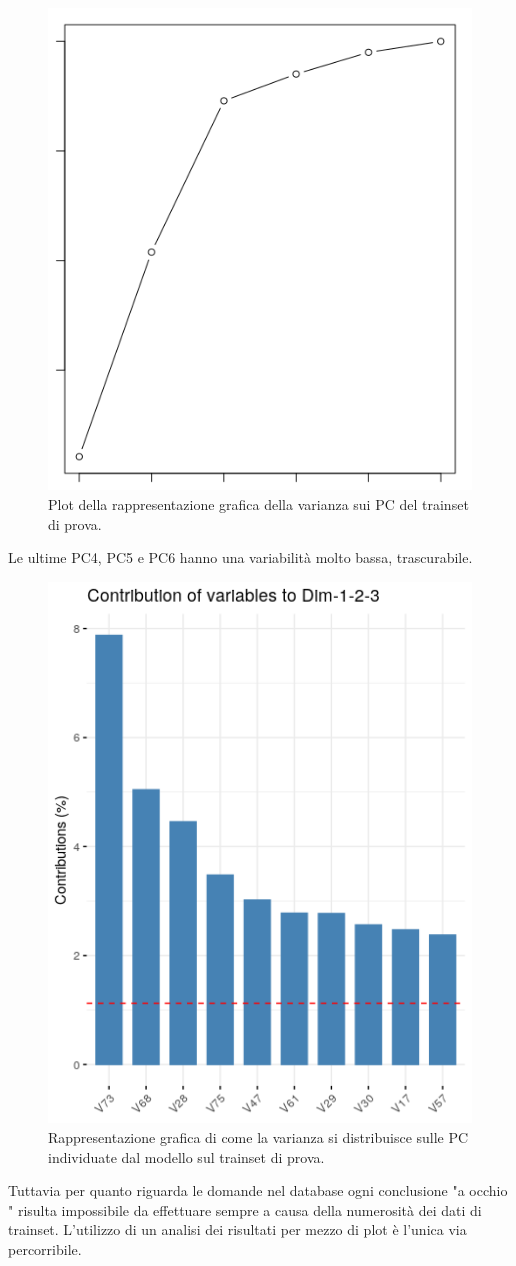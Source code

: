 \begin{figure}[H]
\centering
	\includegraphics[width=0.60\linewidth]{../../PCA/plot/variances2_rete-prova.png}
	\caption{Plot della rappresentazione grafica della varianza sui PC del trainset di prova.}
	\label{Plot della rappresentazione grafica della varianza sui PC del trainset di prova.}
\end{figure}
\noindent
Le ultime PC4, PC5 e PC6 hanno una variabilit\`a molto bassa, trascurabile.
\begin{figure}[H]
\centering
	\includegraphics[width=0.60\linewidth]{../../PCA/plot/varianza-complessiva_rete-prova.png}
	\caption{Rappresentazione grafica di come la varianza si distribuisce sulle PC individuate dal modello sul trainset di prova.}
		\label{Rappresentazione grafica di come la varianza si distribuisce sulle PC individuate dal modello sul trainset di prova.}
\end{figure}
\noindent
Tuttavia per quanto riguarda le domande nel database ogni conclusione "a occhio " risulta  impossibile da effettuare sempre a causa della numerosit\`a dei dati di trainset. L'utilizzo di un analisi dei risultati per mezzo di plot \`e l'unica via percorribile.

